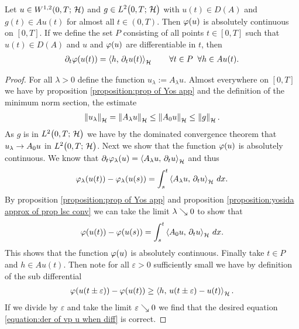\begin{lemma}\label{lemma:lemma for SGD prop of sub diff with in f in ltwo}
	Let $ u\in W^{1,2}(0,T;\,\mathcal{H}) $ and $ g\in L^{2}\big(0,T;\,\mathcal{H}\big) $
	with $ u(t)\in D(A) $ and $ g(t)\in Au(t) $ for almost all
	$ t\in(0,T) $. Then $ \varphi(u) $ is absolutely continuous on $ [0,T] $.
	If we define the set $ P $ consisting of all points $ t\in[0,T] $
	such that $ u(t)\in D(A) $ and $ u $ and $ \varphi(u) $
	are differentiable in $ t $, then
	\begin{align}\label{equation:der of vp u when diff}
		\partial_t \varphi(u(t))=\left\langle h,\,\partial_t u(t)\right\rangle_{\mathcal{H}}
		\qquad\forall t\in P\;\;
		\forall h\in Au(t).	
	\end{align}
\end{lemma}
\begin{proof}
	For all $ \lambda>0 $ define the function
	$ u_\lambda:=A_\lambda u $. Almost everywhere
	on $ [0,T] $ we have by proposition \ref{proposition:prop of Yos app} 
	and the definition of the minimum norm section, the 
	estimate
	\begin{align*}
		\left\Vert u_\lambda\right\Vert_{\mathcal{H}}
		= \left\Vert A_\lambda u\right\Vert_{\mathcal{H}}
		\leq \left\Vert A_0 u\right\Vert_{\mathcal{H}}
		\leq \left\Vert g\right\Vert_{\mathcal{H}}.
	\end{align*}
	As $ g $ is in $ L^{2}\big(0,T;\,\mathcal{H}\big) $ we have 
	by the dominated convergence theorem that
	$ u_\lambda\rightarrow A_0 u $ in $ L^{2}\big(0,T;\,\mathcal{H}\big) $.
	Next we show that the function $ \varphi(u) $ is
	absolutely continuous.
	We know  that 
	$ \partial_t \varphi_\lambda(u)=\left\langle A_\lambda u,\,\partial_t u\right\rangle_{\mathcal{H}} $
	and thus
	\begin{align*}
		\varphi_\lambda(u(t))-\varphi_\lambda(u(s))
		=\int_s^t \left\langle A_\lambda u,\,\partial_t u\right\rangle_{\mathcal{H}}\,dx.
	\end{align*}
	By proposition \ref{proposition:prop of Yos app}  and
	proposition \ref{proposition:yosida approx of prop lsc conv}
	we can take the limit $ \lambda\searrow 0 $ to show that 
	\begin{align*}
		\varphi(u(t))-\varphi(u(s))
		=\int_s^t \left\langle A_0 u,\,\partial_t u\right\rangle_{\mathcal{H}}\,dx.
	\end{align*}
	This shows that the function $ \varphi(u) $ is
	absolutely continuous.
	Finally take $ t\in P $ and $ h\in Au(t) $.
	Then note for all $ \varepsilon>0 $ 
	sufficiently small we have by definition of the
	sub differential
	\begin{align*}
		\varphi(u(t\pm\varepsilon))-\varphi(u(t))
		\geq \left\langle h,\,u(t\pm\varepsilon)-u(t)\right\rangle_{\mathcal{H}}.
	\end{align*}
	If we divide by $ \varepsilon $ and take
	the limit $ \varepsilon\searrow 0 $ we find that
	the desired equation \eqref{equation:der of vp u when diff}
	is correct.
\end{proof}

